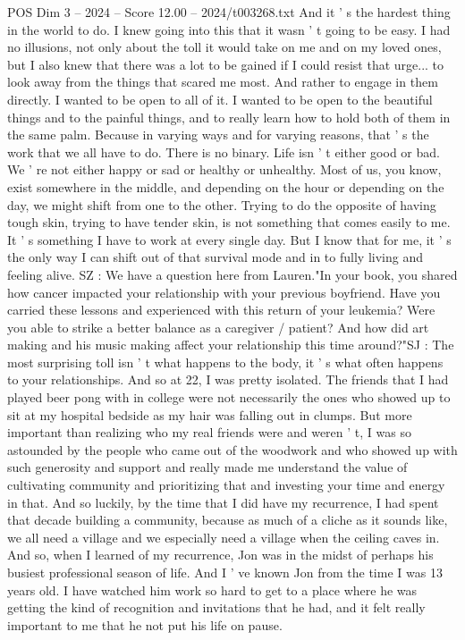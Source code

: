 \begin{textsample}{POS Dim 3 – 2024 – Score 12.00 – 2024/t003268.txt}
And it ' s the hardest thing in the world to do.
I knew going into this that it wasn ' t going to be easy.
I had no illusions, not only about the toll it would take on me and on my loved ones, but I also knew that there was a lot to be gained if I could resist that urge... to look away from the things that scared me most.
And rather to engage in them directly.
I wanted to be open to all of it.
I wanted to be open to the beautiful things and to the painful things, and to really learn how to hold both of them in the same palm.
Because in varying ways and for varying reasons, that ' s the work that we all have to do.
There is no binary.
Life isn ' t either good or bad.
We ' re not either happy or sad or healthy or unhealthy.
Most of us, you know, exist somewhere in the middle, and depending on the hour or depending on the day, we might shift from one to the other.
Trying to do the opposite of having tough skin, trying to have tender skin, is not something that comes easily to me.
It ' s something I have to work at every single day.
But I know that for me, it ' s the only way I can shift out of that survival mode and in to fully living and feeling alive.
SZ : We have a question here from Lauren."In your book, you shared how cancer impacted your relationship with your previous boyfriend.
Have you carried these lessons and experienced with this return of your leukemia?
Were you able to strike a better balance as a caregiver / patient?
And how did art making and his music making affect your relationship this time around?"SJ : The most surprising toll isn ' t what happens to the body, it ' s what often happens to your relationships.
And so at 22, I was pretty isolated.
The friends that I had played beer pong with in college were not necessarily the ones who showed up to sit at my hospital bedside as my hair was falling out in clumps.
But more important than realizing who my real friends were and weren ' t, I was so astounded by the people who came out of the woodwork and who showed up with such generosity and support and really made me understand the value of cultivating community and prioritizing that and investing your time and energy in that.
And so luckily, by the time that I did have my recurrence, I had spent that decade building a community, because as much of a cliche as it sounds like, we all need a village and we especially need a village when the ceiling caves in.
And so, when I learned of my recurrence, Jon was in the midst of perhaps his busiest professional season of life.
And I ' ve known Jon from the time I was 13 years old.
I have watched him work so hard to get to a place where he was getting the kind of recognition and invitations that he had, and it felt really important to me that he not put his life on pause.

\end{textsample}
